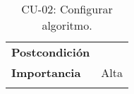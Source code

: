 \begin{longtable}[H]{@{}ll@{}}
\begin{minipage}[t]{0.23\columnwidth}\raggedright\strut
\textbf{Postcondición}\strut
\end{minipage} & \begin{minipage}[t]{0.71\columnwidth}\raggedright\strut
\strut
\end{minipage}\tabularnewline

\begin{minipage}[t]{0.23\columnwidth}\raggedright\strut
\textbf{Importancia}\strut
\end{minipage} & \begin{minipage}[t]{0.71\columnwidth}\raggedright\strut
Alta\strut
\end{minipage}\tabularnewline

\bottomrule
\caption{CU-02: Configurar algoritmo.}
\end{longtable}


